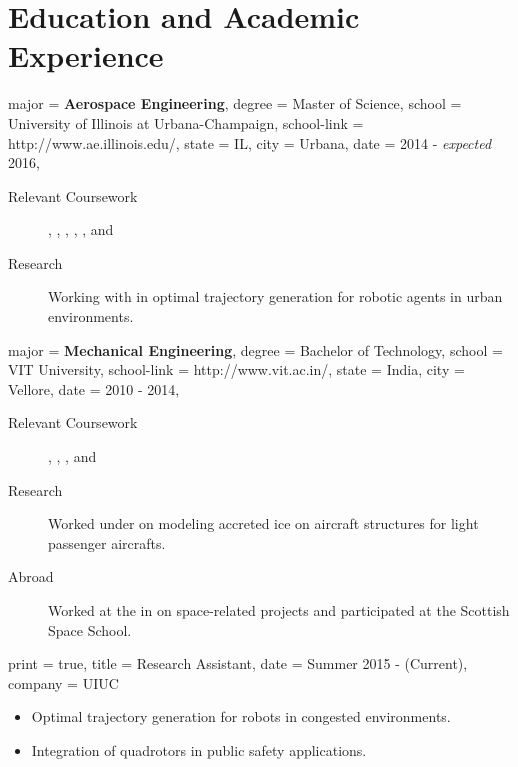 \documentclass{simplecv}
\begin{document}
\section{Education and Academic Experience}
\begin{education}
  {
      major = \textbf{Aerospace Engineering},
      degree = Master of Science,
      school = University of Illinois at Urbana-Champaign,
      school-link = http://www.ae.illinois.edu/,
      state = IL,
      city = Urbana,
      date = 2014 - \textit{expected} 2016,
  }

\begin{description}
    \item[Relevant Coursework]
        ,
    ,
    ,
    ,
    ,
    and 
\item[Research] Working with  in optimal trajectory generation for robotic agents in urban environments.
  
\end{description}
\end{education}
\begin{education}
  {
      major = \textbf{Mechanical Engineering},
      degree = Bachelor of Technology,
      school = VIT University,
      school-link = http://www.vit.ac.in/,
      state = India,
      city = Vellore,
      date = 2010 - 2014,
  }

\begin{description}
    \item[Relevant Coursework]
    ,
    ,
    ,
    and
\item[Research] Worked under  on modeling accreted ice on aircraft structures for light passenger aircrafts.
\item[Abroad] 
    Worked at the \href{http://www.stratch.ac.uk/engineering}{} in  on space-related projects and participated at the Scottish Space School. 
\end{description}
\end{education}

\begin{position}
  {
      print   = true,
      title   = Research Assistant,
      date    = Summer 2015 - (Current),
      company = UIUC
  }

  \begin{itemize}
      \item Optimal trajectory generation for robots in congested environments.
      \item Integration of quadrotors in public safety applications.
  \end{itemize}
\end{position}
\end{document}
